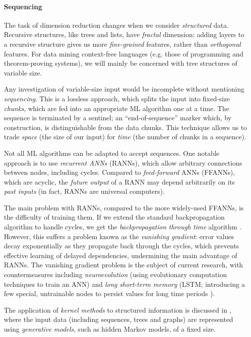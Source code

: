 \paragraph{Sequencing}

The task of dimension reduction changes when we consider \emph{structured} data. Recursive structures, like trees and lists, have \emph{fractal} dimension: adding layers to a recursive structure gives us more \emph{fine-grained} features, rather than \emph{orthogonal} features. For data mining context-free languages (e.g. those of programming and theorem-proving systems), we will mainly be concerned with tree structures of variable size.

Any investigation of variable-size input would be incomplete without mentioning \emph{sequencing}. This is a lossless approach, which splits the input into fixed-size \emph{chunks}, which are fed into an appropriate ML algorithm one at a time. The sequence is terminated by a sentinel; an ``end-of-sequence'' marker which, by construction, is distinguishable from the data chunks. This technique allows us to trade \emph{space} (the size of our input) for \emph{time} (the number of chunks in a sequence).

Not all ML algorithms can be adapted to accept sequences. One notable approach is to use \emph{recurrent ANNs} (RANNs), which allow arbitrary connections between nodes, including cycles. Compared to \emph{feed-forward} ANNs (FFANNs), which are acyclic, the \emph{future output} of a RANN may depend arbitrarily on its \emph{past inputs} (in fact, RANNs are universal computers).

The main problem with RANNs, compared to the more widely-used FFANNs, is the difficulty of training them. If we extend the standard backpropagation algorithm to handle cycles, we get the \emph{backpropagation through time} algorithm \citep{werbos1990backpropagation}. However, this suffers a problem known as the \emph{vanishing gradient}: error values decay exponentially as they propagate back through the cycles, which prevents effective learning of delayed dependencies, undermining the main advantage of RANNs. The vanishing gradient problem is the subject of current research, with countermeasures including \emph{neuroevolution} (using evolutionary computation techniques to train an ANN) and \emph{long short-term memory} (LSTM; introducing a few special, untrainable nodes to persist values for long time periods \citep{hochreiter1997long}).

The application of \emph{kernel methods} to structured information is discussed in \citep{Gartner2003}, where the input data (including sequences, trees and graphs) are represented using \emph{generative models}, such as hidden Markov models, of a fixed size.

